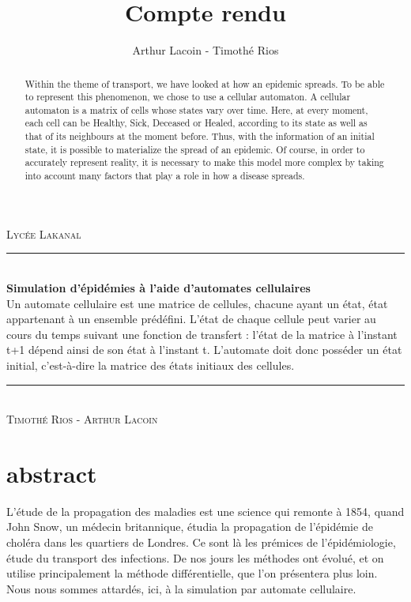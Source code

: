 \documentclass{article}
\title{Compte rendu}
\author{Arthur Lacoin - Timothé Rios}
\date{}
\newcommand{\HRule}{\rule{\linewidth}{0.5mm}}
\begin{document}
\begin{titlepage}
    \begin{sffamily}
    \begin{center}

        \textsc{\LARGE Lycée Lakanal}~\\[2cm]

        \HRule \\[0.4cm]
        { \huge \bfseries Simulation d'épidémies à l'aide d'automates cellulaires\\[0.4cm] }
    Un automate cellulaire est une matrice de cellules, chacune ayant un état, état appartenant à un ensemble prédéfini. L'état de chaque cellule peut varier au cours du temps suivant une fonction de transfert : l'état de la matrice à l'instant t+1 dépend ainsi de son état à l'instant t. L'automate doit donc posséder un état initial, c'est-à-dire la matrice des états initiaux des cellules.
        \HRule \\[2cm]
        \textsc{\Large Timothé Rios - Arthur Lacoin}\\[2cm]

    \end{center}
\end{sffamily}
\end{titlepage}

\tableofcontents

\begin{abstract}

Within the theme of transport, we have looked at how an epidemic spreads. To be able to represent this phenomenon, we chose to use a cellular automaton. A cellular automaton is a matrix of cells whose states vary over time. Here, at every moment, each cell can be Healthy, Sick, Deceased or Healed, according to its state as well as that of its neighbours at the moment before. Thus, with the information of an initial state, it is possible to materialize the spread of an epidemic. Of course, in order to accurately represent reality, it is necessary to make this model more complex by taking into account many factors that play a role in how a disease spreads.

\end{abstract}

\section{abstract}
	L'étude de la propagation des maladies est une science qui remonte à 1854, quand John Snow, un médecin britannique, étudia la propagation de l'épidémie de choléra dans les quartiers de Londres. Ce sont là les prémices de l'épidémiologie, étude du transport des infections. De nos jours les méthodes ont évolué, et on utilise principalement la méthode différentielle, que l'on présentera plus loin. Nous nous sommes attardés, ici, à la simulation par automate cellulaire.
\end{document}
